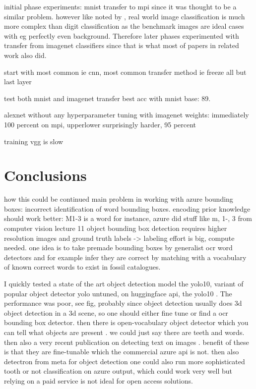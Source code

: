 \documentclass{article}
\begin{document}
initial phase experiments: mnist transfer to mpi since it was thought to be a similar problem. 
however like noted by \cite{alexnet}, real world image classification is much more complex than digit classification 
as the benchmark images are ideal cases with eg perfectly even background. Therefore later phases 
experimented with transfer from imagenet classifiers since that is what most of papers in related work also did.

start with most common ie cnn, most common transfer method ie freeze all but last layer 

test both mnist and imagenet transfer 
best acc with mnist base: 89.

alexnet without any hyperparameter tuning with imagenet weights: immediately 100 percent on mpi,
upperlower surprisingly harder, 95 percent

training vgg is slow

\section{Conclusions}

how this could be continued
main problem in working with azure bounding boxes: incorrect identification of word bounding boxes.
encoding prior knowledge should work better: M1-3 is a word for instance, azure did stuff like m, 1-, 3
from computer vision lecture 11 \cite{ruotsalainen2024}
object bounding box detection requires higher resolution images and ground truth labels -> labeling effort is 
big, compute needed. one idea is to take premade bounding boxes by generalist ocr word detectors and for example
infer they are correct by matching with a vocabulary of known correct words to exist in fossil catalogues.

I quickly tested a state of the art object detection model the yolo10, variant of popular object detector yolo\cite{redmonYouOnlyLook2016}
 untuned, on huggingface api, the yolo10 \cite{OmouredYOLOv10DocumentLayoutAnalysisHugging2023}. The performance 
was poor, see fig, probably since object detection usually does 3d object detection in a 3d scene, so one should either 
fine tune or find a ocr bounding box detector. then there is open-vocabulary object detector which you can tell what objects 
are present \cite{YOLOWorldRealTimeOpenVocabulary}. we could just say there are teeth and words. 
then also a very recent publication on detecting text on images \cite{longHierarchicalTextSpotter2024}.
benefit of these is that they are fine-tunable which the commercial azure api is not. 
then also detectron \cite{Detectron} from meta for object detection
one could also run more sophisticated 
tooth or not classification on azure output, which could work very well but relying on a paid service is not ideal 
for open access solutions.
\end{document}
